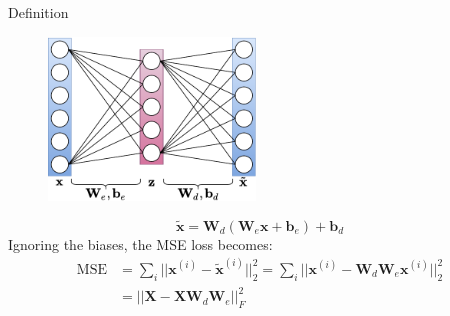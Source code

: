 \documentclass[handout]{beamer}
\begin{document}
  \begin{frame}{Definition}

    \begin{figure}
      \includegraphics[width=5.5cm]{rc/linear-autoencoder}
    \end{figure}
    \vspace{-0.25cm}
    \begin{equation*}
      \tilde{\mathbf{x}} = \mathbf{W}_d \left(\mathbf{W}_e \mathbf{x} + \mathbf{b}_e\right) + \mathbf{b}_d
    \end{equation*}
    \pause
    Ignoring the biases, the MSE loss becomes:
    \vspace{0cm}
    \begin{align*}
      \text{MSE} &= \sum_i ||\mathbf{x}^{(i)} - \tilde{\mathbf{x}}^{(i)}||_2^2 = \sum_i ||\mathbf{x}^{(i)} - \mathbf{W}_d \mathbf{W}_e \mathbf{x}^{(i)}||_2^2 \\
                 &= ||\mathbf{X} - \mathbf{X} \mathbf{W}_d \mathbf{W}_e||_F^2
    \end{align*}
    
  \end{frame}
\end{document}
